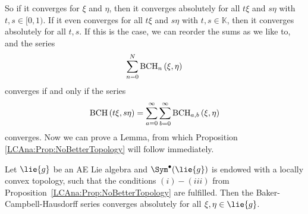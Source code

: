 So if it converges for $\xi$ and $\eta$, then it converges absolutely for all 
$t \xi$ and $s \eta$ with $t,s \in [0, 1)$. If it even converges for all $t 
\xi$ and $s \eta$ with $t, s \in \mathbb{K}$, then it converges absolutely for 
all $t, s$. If this is the case, we can reorder the sums as we like to, and the 
series
\begin{equation*}
	\sum\limits_{n = 0}^N
	\mathrm{BCH}_{n}\left(\xi, \eta\right)
\end{equation*}
converges if and only if the series
\begin{equation*}
	\mathrm{BCH}\left(t \xi, s \eta\right)
	=
	\sum\limits_{a = 0}^{\infty}
	\sum\limits_{b = 0}^{\infty}
	\mathrm{BCH}_{a, b}\left(\xi, \eta\right)
\end{equation*}
converges. Now we can prove a Lemma, from which Proposition 
\ref{LCAna:Prop:NoBetterTopology} will follow immediately.
\begin{lemma}
	Let $\lie{g}$ be an AE Lie algebra and $\Sym^{\bullet}(\lie{g})$ is 
	endowed with a locally convex topology, such that the conditions $(i) - 
	(iii)$ from Proposition~\ref{LCAna:Prop:NoBetterTopology} are fulfilled. 
	Then the Baker-Campbell-Hausdorff series converges absolutely for all 
	$\xi, \eta \in \lie{g}$.
\end{lemma}
